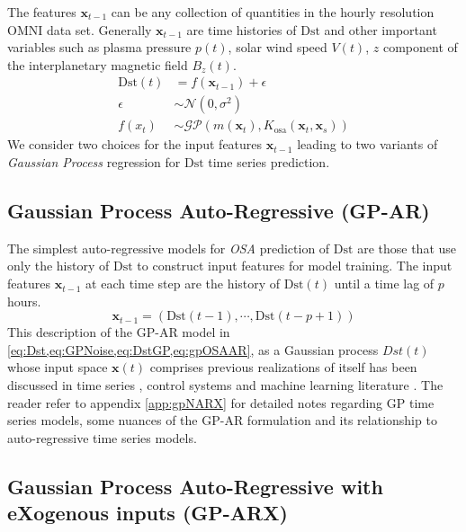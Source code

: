 The features $ \mathbf{x}_{t-1}$ can be any collection of quantities in the hourly resolution OMNI data set. Generally $\mathbf{x}_{t-1}$ are time histories of $\mathrm{Dst}$ and other important variables such as plasma pressure $p(t)$, solar wind speed $V(t)$, $z$ component of the interplanetary magnetic field $B_z(t)$.
%
\begin{align}
    \mathrm{Dst}(t) & =  f(\mathbf{x}_{t-1}) + \epsilon \label{eq:Dst} \\
    \epsilon & \sim  \mathcal{N}(0, \sigma^2) \label{eq:GPNoise} \\
    f(x_t) & \sim  \mathcal{GP}(m(\mathbf{x}_t), K_{\text{osa}}(\mathbf{x}_t, \mathbf{x}_s)) \label{eq:DstGP}
\end{align}
%
We consider two choices for the input features $ \mathbf{x}_{t-1}$ leading to two variants of \emph{Gaussian Process} regression for $\mathrm{Dst}$ time series prediction.

\subsection{Gaussian Process Auto-Regressive (GP-AR)} \label{sec:gpar}

The simplest auto-regressive models for \emph{OSA} prediction of $\mathrm{Dst}$ are those that use only the history of $\mathrm{Dst}$ to construct input features for model training. The input features $\mathbf{x}_{t-1}$ at each time step are the history of $\mathrm{Dst}(t)$ until a time lag of $p$ hours.
%
\begin{equation}\label{eq:gpOSAAR}
    \mathbf{x}_{t-1} = \left(\mathrm{Dst}(t-1), \cdots , \mathrm{Dst}(t-p+1)\right)
\end{equation}
%
This description of the GP-AR model in \cref{eq:Dst,eq:GPNoise,eq:DstGP,eq:gpOSAAR}, as a Gaussian process $Dst(t)$ 
whose input space $\mathbf{x}(t)$ comprises previous realizations of itself has been discussed in time series 
\citep{roberts2013gaussian}, control systems \citep{kocijan2015modelling} and machine learning literature 
\citep{wang2006gaussian,wang2007gaussian}. The reader refer to appendix \ref{app:gpNARX} for detailed notes 
regarding GP time series models, some nuances of the GP-AR formulation and its relationship to auto-regressive 
time series models. 

\subsection{Gaussian Process Auto-Regressive with eXogenous inputs (GP-ARX)} \label{sec:gparx}

